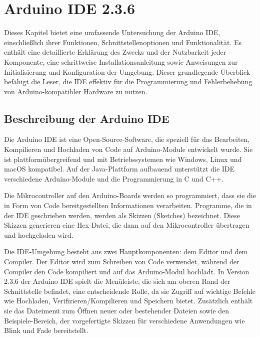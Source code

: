 %
%
%


\chapter{Arduino IDE 2.3.6}\label{ArduinoIDE2}
Dieses Kapitel bietet eine umfassende Untersuchung der Arduino IDE, einschließlich ihrer Funktionen, Schnittstellenoptionen und Funktionalität. Es enthält eine detaillierte Erklärung des Zwecks und der Nutzbarkeit jeder Komponente, eine schrittweise Installationsanleitung sowie Anweisungen zur Initialisierung und Konfiguration der Umgebung. Dieser grundlegende Überblick befähigt die Leser, die IDE effektiv für die Programmierung und Fehlerbehebung von Arduino-kompatibler Hardware zu nutzen.

\section{Beschreibung der Arduino IDE}\label{ArduinoIDE}

Die Arduino IDE ist eine Open-Source-Software, die speziell für das Bearbeiten, Kompilieren und Hochladen von Code auf Arduino-Module entwickelt wurde. Sie ist plattformübergreifend und mit Betriebssystemen wie Windows, Linux und macOS kompatibel. Auf der Java-Plattform aufbauend unterstützt die IDE verschiedene Arduino-Module und die Programmierung in C und C++.

Die Mikrocontroller auf den Arduino-Boards werden so programmiert, dass sie die in Form von Code bereitgestellten Informationen verarbeiten. Programme, die in der IDE geschrieben werden, werden als Skizzen (Sketches) bezeichnet. Diese Skizzen generieren eine Hex-Datei, die dann auf den Mikrocontroller übertragen und hochgeladen wird.

Die IDE-Umgebung besteht aus zwei Hauptkomponenten: dem Editor und dem Compiler. Der Editor wird zum Schreiben von Code verwendet, während der Compiler den Code kompiliert und auf das Arduino-Modul hochlädt.\cite{ArduinoWeb:2025} In Version 2.3.6 der Arduino IDE spielt die Menüleiste, die sich am oberen Rand der Schnittstelle befindet, eine entscheidende Rolle, da sie Zugriff auf wichtige Befehle wie Hochladen, Verifizieren/Kompilieren und Speichern bietet. Zusätzlich enthält sie das Dateimenü zum Öffnen neuer oder bestehender Dateien sowie den Beispiele-Bereich, der vorgefertigte Skizzen für verschiedene Anwendungen wie Blink und Fade bereitstellt.

